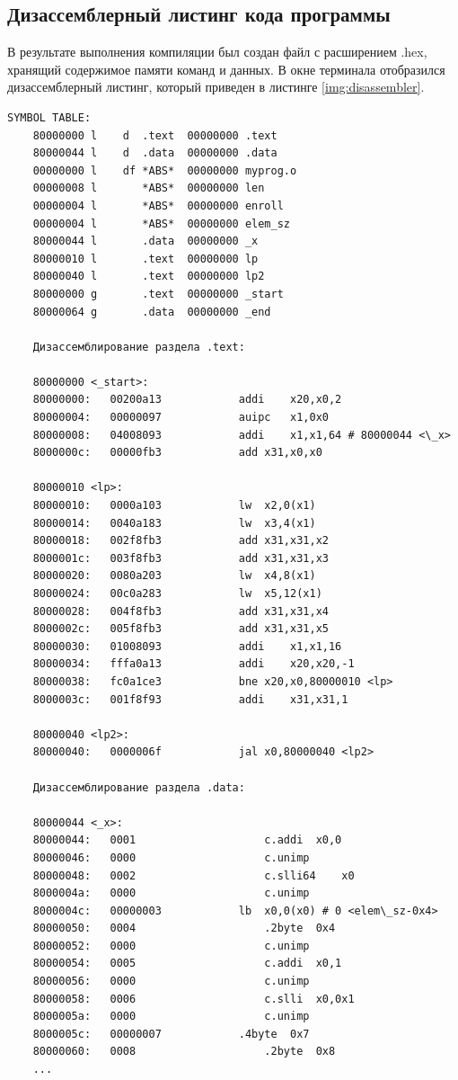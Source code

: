 \subsection{Дизассемблерный листинг кода программы}
В результате выполнения компиляции был создан файл с расширением .hex, хранящий содержимое памяти команд и данных. В окне терминала отобразился дизассемблерный листинг, который приведен в листинге \ref{img:disassembler}.

\begin{lstlisting}[extendedchars=true, keepspaces=true, escapechar=\%, texcl=true, label=img:disassembler,caption=Дизассемблированная программа по варианту]
	SYMBOL TABLE:
	80000000 l    d  .text	00000000 .text
	80000044 l    d  .data	00000000 .data
	00000000 l    df *ABS*	00000000 myprog.o
	00000008 l       *ABS*	00000000 len
	00000004 l       *ABS*	00000000 enroll
	00000004 l       *ABS*	00000000 elem_sz
	80000044 l       .data	00000000 _x
	80000010 l       .text	00000000 lp
	80000040 l       .text	00000000 lp2
	80000000 g       .text	00000000 _start
	80000064 g       .data	00000000 _end
	
	Дизассемблирование раздела .text:
	
	80000000 <_start>:
	80000000:	00200a13          	addi	x20,x0,2
	80000004:	00000097          	auipc	x1,0x0
	80000008:	04008093          	addi	x1,x1,64 # 80000044 <\_x>
	8000000c:	00000fb3          	add	x31,x0,x0
	
	80000010 <lp>:
	80000010:	0000a103          	lw	x2,0(x1)
	80000014:	0040a183          	lw	x3,4(x1)
	80000018:	002f8fb3          	add	x31,x31,x2
	8000001c:	003f8fb3          	add	x31,x31,x3
	80000020:	0080a203          	lw	x4,8(x1)
	80000024:	00c0a283          	lw	x5,12(x1)
	80000028:	004f8fb3          	add	x31,x31,x4
	8000002c:	005f8fb3          	add	x31,x31,x5
	80000030:	01008093          	addi	x1,x1,16
	80000034:	fffa0a13          	addi	x20,x20,-1
	80000038:	fc0a1ce3          	bne	x20,x0,80000010 <lp>
	8000003c:	001f8f93          	addi	x31,x31,1
	
	80000040 <lp2>:
	80000040:	0000006f          	jal	x0,80000040 <lp2>
	
	Дизассемблирование раздела .data:
	
	80000044 <_x>:
	80000044:	0001                	c.addi	x0,0
	80000046:	0000                	c.unimp
	80000048:	0002                	c.slli64	x0
	8000004a:	0000                	c.unimp
	8000004c:	00000003          	lb	x0,0(x0) # 0 <elem\_sz-0x4>
	80000050:	0004                	.2byte	0x4
	80000052:	0000                	c.unimp
	80000054:	0005                	c.addi	x0,1
	80000056:	0000                	c.unimp
	80000058:	0006                	c.slli	x0,0x1
	8000005a:	0000                	c.unimp
	8000005c:	00000007          	.4byte	0x7
	80000060:	0008                	.2byte	0x8
	...
\end{lstlisting}

